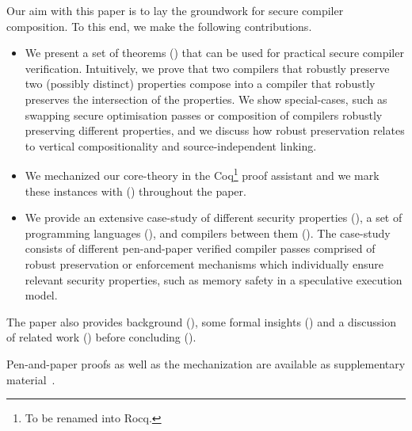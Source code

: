   Our aim with this paper is to lay the groundwork for secure compiler composition.
  To this end, we make the following contributions.
  \begin{itemize}
    \item 
      We present a set of theorems () that can be used for practical secure compiler verification.
      Intuitively, we prove that two compilers that robustly preserve two (possibly distinct) properties compose into a compiler that robustly preserves the intersection of the properties.
      We show special-cases, such as swapping secure optimisation passes or composition of compilers robustly preserving different properties, and we discuss how robust preservation relates to vertical compositionality and source-independent linking.
    \item
      We mechanized our core-theory in the Coq\footnote{To be renamed into Rocq.} proof assistant and we mark these instances with (\CoqSymbol) throughout the paper.
    \item 
      We provide an extensive case-study of different security properties (), a set of programming languages (), and compilers between them ().
      The case-study consists of different pen-and-paper verified compiler passes comprised of robust preservation or enforcement mechanisms which individually ensure relevant security properties, such as memory safety in a speculative execution model.
  \end{itemize}
  The paper also provides background (), some formal insights () and a discussion of related work () before concluding ().

  Pen-and-paper proofs as well as the mechanization are available as supplementary material~\cite{}.

